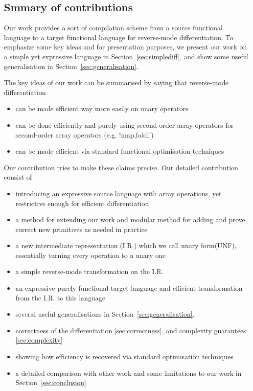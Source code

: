 \subsection{Smmary of contributions}

Our work provides a sort of compilation scheme from a source functional language to a target functional language for reverse-mode differentiation.
To emphasize some key ideas and for presentation purposes, we present our work on a simple yet expressive language in Section~\ref{sec:simplediff}, 
and show some useful generalisation in Section~\ref{sec:generalisation}. 

The key ideas of our work can be summarised by saying that reverse-mode differentiation
\begin{itemize}
   \item can be made efficient way more easily on unary operators
   \item can be done efficiently and purely using second-order array operators for second-order array operators (e.g. !map,foldl!) 
   \item can be made efficient via standard functional optimisation techniques
\end{itemize}

Our contribution tries to make these claims precise. Our detailed  contribution consist of
\begin{itemize}
    \item introducing an expressive source language with array operations, yet restrictive enough for efficient differentiation
    \item a method for extending our work and modular method for adding and prove correct new primitives as needed in practice 
    \item a new intermediate representation (I.R.) which we call unary form(UNF), essentially turning every operation to a unary one
    \item a simple reverse-mode transformation on the I.R.
    \item an expressive purely functional target language and efficient transformation from the I.R. to this language
    \item several useful generalisations in Section~\ref{sec:generalisation}. 
    \item correctness of the differentiation \ref{sec:correctness}, and complexity guarantees \ref{sec:complexity}
    \item showing how efficiency  is recovered via standard optimisation techniques
    \item a detailed comparison with other work and some limitations to our work in Section~\ref{sec:conclusion}
\end{itemize}

